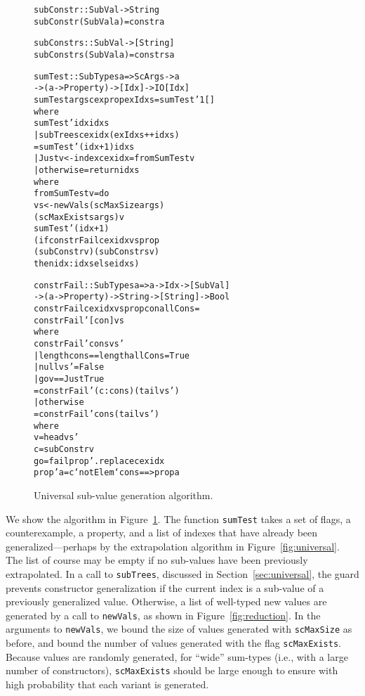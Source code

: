\documentclass{sigplanconf}
\newenvironment{code}{\begin{alltt}}{\end{alltt}}
\newcommand{\ttp}[1]{\texttt{#1}}
\begin{document}
\begin{figure}
  \begin{code}
subConstr :: SubVal -> String
subConstr (SubVal a) = constr a

subConstrs :: SubVal -> [String]
subConstrs (SubVal a) = constrs a

sumTest :: SubTypes a => ScArgs -> a
  -> (a -> Property) -> [Idx] -> IO [Idx]
sumTest args cex prop exIdxs = sumTest' 1 []
  where
  sumTest' idx idxs
    | subTrees cex idx (exIdxs ++ idxs)
    = sumTest' (idx+1) idxs
    | Just v <- index cex idx = fromSumTest v
    | otherwise = return idxs
    where
    fromSumTest v = do
      vs <- newVals (scMaxSize args)
              (scMaxExists args) v
      sumTest' (idx+1)
        (if constrFail cex idx vs prop
           (subConstr v) (subConstrs v)
           then idx:idxs else idxs)

constrFail :: SubTypes a => a -> Idx -> [SubVal]
  -> (a -> Property) -> String -> [String] -> Bool
constrFail cex idx vs prop con allCons =
  constrFail' [con] vs
  where
  constrFail' cons vs'
    | length cons == length allCons = True
    | null vs'                      = False
    | go v == Just True
    = constrFail' (c:cons) (tail vs')
    | otherwise
    = constrFail' cons (tail vs')
    where
    v  = head vs'
    c  = subConstr v
    go = fail prop' . replace cex idx
    prop' a = c `notElem` cons ==> prop a
  \end{code}
  \caption{Universal sub-value generation algorithm.}
  \label{fig:constrs}
\end{figure}

We show the algorithm in Figure~\ref{fig:constrs}.  The function \ttp{sumTest}
takes a set of flags, a counterexample, a property, and a list of indexes that
have already been generalized---perhaps by the extrapolation algorithm in
Figure~\ref{fig:universal}.  The list of course may be empty if no sub-values
have been previously extrapolated.  In a call to \ttp{subTrees}, discussed in
Section~\ref{sec:universal}, the guard prevents constructor generalization if
the current index is a sub-value of a previously generalized value.  Otherwise,
a list of well-typed new values are generated by a call to \ttp{newVals}, as
shown in Figure~\ref{fig:reduction}.  In the arguments to \ttp{newVals}, we
bound the size of values generated with \ttp{scMaxSize} as before, and bound the
number of values generated with the flag \ttp{scMaxExists}.  Because values are
randomly generated, for ``wide'' sum-types (i.e., with a large number of
constructors), \ttp{scMaxExists} should be large enough to ensure with high
probability that each variant is generated.
\end{document}
